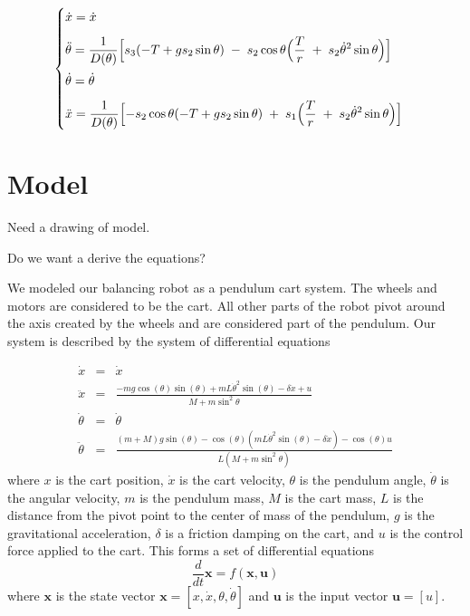 \documentclass[]{article}
\newcommand{\bx}{\boldsymbol{x}}
\newcommand{\bu}{\boldsymbol{u}}
\begin{document}
$$
\begin{cases}
\dot x = \dot x \\[8pt]
\ddot \theta = \displaystyle
  \frac{1}{D(\theta)}\Bigl[
     s_3 (-T + g s_2 \sin \theta)
     \;-\;
     s_2  \cos \theta \Big(\dfrac{T}{r} \; + \;s_2 \dot{\theta}^2 \sin \theta \Big)
  \Bigr] \\[10pt]
\dot \theta = \dot \theta \\[8pt]
\ddot x = \displaystyle
  \frac{1}{D(\theta)}\Bigl[
     -s_2 \cos \theta (-T + g s_2 \sin \theta) 
     \;+\;
      s_1 \Big(\dfrac{T}{r} \; + \;s_2 \dot{\theta}^2 \sin \theta \Big)
  \Bigr]
\end{cases}
$$


\section*{Model}
Need a drawing of model.

Do we want a derive the equations?

We modeled our balancing robot as a pendulum cart system. The wheels and motors are considered to be the cart. All other parts of the robot pivot around the axis created by the wheels and are considered part of the pendulum. Our system is described by the system of differential equations

\begin{eqnarray}
	\dot{x} & = & \dot{x} \label{dfx} \\ 
	\ddot{x}          & = & \frac{-mg \cos(\theta)\sin(\theta) + mL{\dot{\theta}}^2 \sin(\theta)-\delta \dot{x}+u }{M+m\sin^2\theta}  \label{dfv} \\
	\dot{\theta}  &= & \dot{\theta} \label{dftheta} \\	
	\ddot{\theta}  &= & \frac{(m+M)g\sin(\theta)-\cos(\theta)(mL{\dot{\theta}}^2\sin(\theta)-\delta \dot{x})-\cos(\theta)u}{L(M+m\sin^2\theta)} \label{dfomega}
\end{eqnarray}
where $x$ is the cart position, $\dot{x}$ is the cart velocity, $\theta$ is the pendulum angle, $\dot{\theta}$ is the angular velocity, $m$ is the pendulum mass, $M$ is the cart mass, $L$ is the distance from the pivot point to the center of mass of the pendulum, $g$ is the gravitational acceleration, $\delta$ is a friction damping on the cart, and $u$ is the control force applied to the cart. This forms a set of differential equations 
\begin{equation}
	\frac{d}{dt} \bx = f(\bx, \bu) \label{dfdx}
\end{equation}
where $\bx$ is the state vector $\bx = [x, \dot{x}, \theta, \dot{\theta}]$ and $\bu$ is the input vector $\bu=[u]$.
\end{document}
